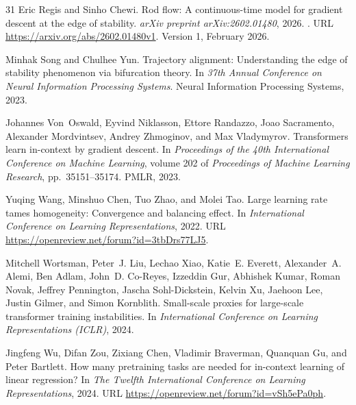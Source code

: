 \documentclass[11pt]{article}
\begin{document}
\begin{thebibliography}{31}
Eric Regis and Sinho Chewi.
\newblock Rod flow: A continuous-time model for gradient descent at the edge of
  stability.
\newblock \emph{arXiv preprint arXiv:2602.01480}, 2026.
\newblock {}.
\newblock URL \url{https://arxiv.org/abs/2602.01480v1}.
\newblock Version 1, February 2026.

Minhak Song and Chulhee Yun.
\newblock Trajectory alignment: Understanding the edge of stability phenomenon
  via bifurcation theory.
\newblock In \emph{37th Annual Conference on Neural Information Processing
  Systems}. Neural Information Processing Systems, 2023.

Johannes Von~Oswald, Eyvind Niklasson, Ettore Randazzo, Joao Sacramento,
  Alexander Mordvintsev, Andrey Zhmoginov, and Max Vladymyrov.
\newblock Transformers learn in-context by gradient descent.
\newblock In \emph{Proceedings of the 40th International Conference on Machine
  Learning}, volume 202 of \emph{Proceedings of Machine Learning Research},
  pp.\  35151--35174. PMLR, 2023.

Yuqing Wang, Minshuo Chen, Tuo Zhao, and Molei Tao.
\newblock Large learning rate tames homogeneity: Convergence and balancing
  effect.
\newblock In \emph{International Conference on Learning Representations}, 2022.
\newblock URL \url{https://openreview.net/forum?id=3tbDrs77LJ5}.

Mitchell Wortsman, Peter~J. Liu, Lechao Xiao, Katie~E. Everett, Alexander~A.
  Alemi, Ben Adlam, John~D. Co-Reyes, Izzeddin Gur, Abhishek Kumar, Roman
  Novak, Jeffrey Pennington, Jascha Sohl-Dickstein, Kelvin Xu, Jaehoon Lee,
  Justin Gilmer, and Simon Kornblith.
\newblock Small-scale proxies for large-scale transformer training
  instabilities.
\newblock In \emph{International Conference on Learning Representations
  (ICLR)}, 2024.

Jingfeng Wu, Difan Zou, Zixiang Chen, Vladimir Braverman, Quanquan Gu, and
  Peter Bartlett.
\newblock How many pretraining tasks are needed for in-context learning of
  linear regression?
\newblock In \emph{The Twelfth International Conference on Learning
  Representations}, 2024.
\newblock URL \url{https://openreview.net/forum?id=vSh5ePa0ph}.


\end{thebibliography}
\end{document}
